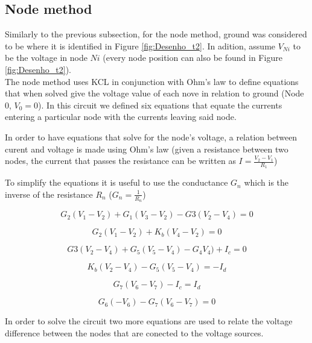 \subsection{Node method}
\label{subsec:node_met}


Similarly to the previous subsection, for the node method, ground was considered to be where it is identified in
Figure \ref{fig:Desenho_t2}. In adition, assume $V_{Ni}$ to be the voltage in node $Ni$ (every node position can
also be found in Figure \ref{fig:Desenho_t2}). \\

The node method uses KCL in conjunction with Ohm’s law to define equations that when solved give the voltage value 
of each nove in relation to ground (Node 0, $V_0 = 0$). In this circuit we defined six equations that equate the 
currents entering a particular node with the currents leaving said node. 

In order to have equations that solve for the node’s voltage, a relation between curent and voltage is made using 
Ohm’s law (given a resistance between two nodes, the current that passes the resistance can be written as 
$I=\frac{V_2-V_1}{R_1}$)

To simplify the equations it is useful to use the conductance $G_n$ which is the inverse of the resistance $R_n$ 
($G_n=\frac{1}{R_n}$)

\begin{equation}
	G_2(V_1-V_2)+G_1(V_3-V_2) - G3(V_2-V_4) = 0
	\label{}
\end{equation}

\begin{equation}
	G_2(V_1-V_2)+K_b(V_4-V_2) = 0
	\label{}
\end{equation}

\begin{equation}
	G3(V_2-V_4)+G_5(V_5-V_4)-G_4V_4)+I_c=0
	\label{}
\end{equation} 

\begin{equation}
	K_b(V_2-V_4)-G_5(V_5-V_4)=-I_d
	\label{}
\end{equation}

\begin{equation}
	G_7(V_6-V_7)-I_c=I_d
	\label{}
\end{equation}

\begin{equation}
	G_6(-V_6)-G_7(V_6-V_7)=0
	\label{}
\end{equation}

In order to solve the circuit two more equations are used to relate the voltage difference between the nodes that 
are conected to the voltage sources.

